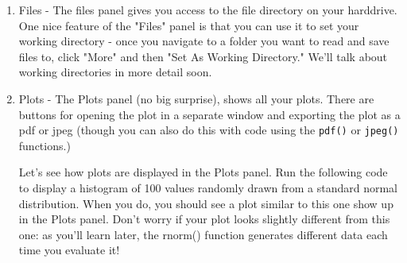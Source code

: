 \documentclass{tufte-book}\usepackage[]{graphicx}\usepackage[]{color}
\begin{document}
\begin{enumerate}

\item Files - The files panel gives you access to the file directory on your harddrive. One nice feature of the "Files" panel is that you can use it to set your working directory - once you navigate to a folder you want to read and save files to, click "More" and then "Set As Working Directory." We'll talk about working directories in more detail soon.

\item Plots - The Plots panel (no big surprise), shows all your plots. There are buttons for opening the plot in a separate window and exporting the plot as a pdf or jpeg (though you can also do this with code using the \texttt{pdf()} or \texttt{jpeg()} functions.)

Let's see how plots are displayed in the Plots panel. Run the following code to display a histogram of 100 values randomly drawn from a standard normal distribution. When you do, you should see a plot similar to this one show up in the Plots panel. Don't worry if your plot looks slightly different from this one: as you'll learn later, the rnorm() function generates different data each time you evaluate it!



\end{enumerate}
\end{document}
